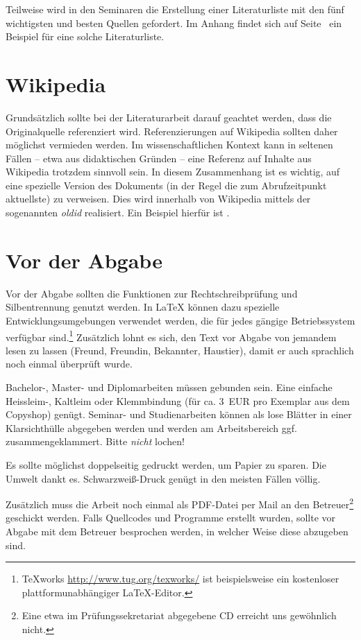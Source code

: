 \documentclass[
    fontsize=12pt,
    headings=small,
    parskip=half,           %
    bibliography=totoc,
    numbers=noenddot,       %
    open=any,               %
    ]{scrreprt}
\begin{document}
Teilweise wird in den Seminaren die Erstellung einer Literaturliste mit den fünf wichtigsten und besten Quellen gefordert. Im Anhang findet sich auf Seite~\pageref{sec:literaturliste} ein Beispiel für eine solche Literaturliste.

\section{Wikipedia}

Grundsätzlich sollte bei der Literaturarbeit darauf geachtet werden, dass die Originalquelle 
referenziert wird. Referenzierungen auf Wikipedia sollten daher möglichst vermieden werden. Im wissenschaftlichen Kontext kann in seltenen Fällen -- etwa aus didaktischen Gründen -- eine Referenz auf Inhalte aus Wikipedia trotzdem sinnvoll sein. In diesem Zusammenhang ist es wichtig, auf eine spezielle Version des Dokuments (in der Regel die zum Abrufzeitpunkt aktuellste) zu verweisen. Dies wird innerhalb von Wikipedia mittels der sogenannten \emph{oldid} realisiert. Ein Beispiel hierfür ist \cite{Wiki}.

\section{Vor der Abgabe}

Vor der Abgabe sollten die Funktionen zur Rechtschreibprüfung und Silbentrennung genutzt werden. In LaTeX können dazu spezielle Entwicklungsumgebungen verwendet werden, die für jedes gängige Betriebssystem verfügbar sind.\footnote{TeXworks \url{http://www.tug.org/texworks/} ist beispielsweise ein kostenloser plattformunabhängiger LaTeX-Editor.} Zusätzlich lohnt es sich, den Text vor Abgabe von jemandem lesen zu lassen (Freund, Freundin, Bekannter, Haustier), damit er auch sprachlich noch einmal überprüft wurde.

Bachelor-, Master- und Diplomarbeiten müssen gebunden sein. Eine einfache Heissleim-, Kaltleim oder Klemmbindung (für ca. 3~EUR pro Exemplar aus dem Copyshop) genügt. Seminar- und Studienarbeiten können als lose Blätter in einer Klarsichthülle abgegeben werden und werden am Arbeitsbereich ggf. zusammengeklammert. Bitte \emph{nicht} lochen!

Es sollte möglichst doppelseitig gedruckt werden, um Papier zu sparen. Die Umwelt dankt es. Schwarzweiß-Druck genügt in den meisten Fällen völlig.

Zusätzlich muss die Arbeit noch einmal als PDF-Datei per Mail an den Betreuer\footnote{Eine etwa im Prüfungssekretariat abgegebene CD erreicht uns gewöhnlich nicht.} geschickt werden. Falls Quellcodes und Programme erstellt wurden, sollte vor Abgabe mit dem Betreuer besprochen werden, in welcher Weise diese abzugeben sind.
\end{document}
